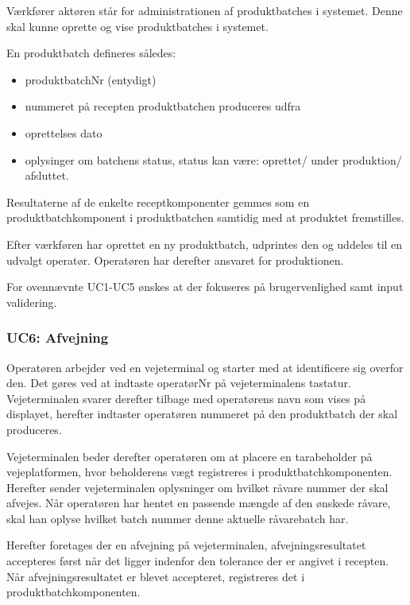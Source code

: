 \documentclass[a4paper]{article}
\begin{document}
Værkfører aktøren står for administrationen af produktbatches i systemet. Denne skal kunne oprette og vise produktbatches i systemet.

En produktbatch defineres således:

\begin{itemize}
  \item produktbatchNr (entydigt)
  \item nummeret på recepten produktbatchen produceres udfra
  \item oprettelses dato
  \item oplysinger om batchens status, status kan være: oprettet/ under produktion/ afsluttet.
\end{itemize}

Resultaterne af de enkelte receptkomponenter gemmes som en produktbatchkomponent i produktbatchen samtidig med at produktet fremstilles.

Efter værkføren har oprettet en ny produktbatch, udprintes den og uddeles til en udvalgt operatør. Operatøren har derefter ansvaret for produktionen. 

For ovennævnte UC1-UC5 ønskes at der fokuseres på brugervenlighed samt input validering.


\subsubsection{UC6: Afvejning} %

Operatøren arbejder ved en vejeterminal og starter med at identificere sig overfor den. Det gøres ved at indtaste operatørNr på vejeterminalens tastatur. Vejeterminalen svarer derefter tilbage med operatørens navn som vises på displayet, herefter indtaster operatøren nummeret på den produktbatch der skal produceres.

Vejeterminalen beder derefter operatøren om at placere en tarabeholder på vejeplatformen, hvor beholderens vægt registreres i produktbatchkomponenten. Herefter sender vejeterminalen oplysninger om hvilket råvare nummer der skal afvejes. Når operatøren har hentet en passende mængde af den ønskede råvare, skal han oplyse hvilket batch nummer denne aktuelle råvarebatch har.

Herefter foretages der en afvejning på vejeterminalen, afvejningsresultatet accepteres først når det ligger indenfor den tolerance der er angivet i recepten. Når afvejningsresultatet er blevet accepteret, registreres det i produktbatchkomponenten. 
\end{document}
